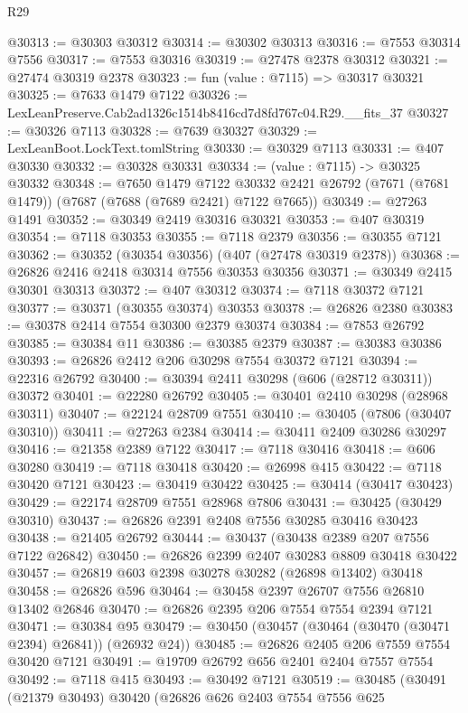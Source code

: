 \begin{lexlean}{R29}
\begin{coremodule}
@30313 := @30303 @30312
@30314 := @30302 @30313
@30316 := @7553 @30314 @7556
@30317 := @7553 @30316
@30319 := @27478 @2378 @30312
@30321 := @27474 @30319 @2378
@30323 := fun (value : @7115) => @30317 @30321
@30325 := @7633 @1479 @7122
@30326 := LexLeanPreserve.Cab2ad1326c1514b8416cd7d8fd767c04.R29.__fits_37
@30327 := @30326 @7113
@30328 := @7639 @30327
@30329 := LexLeanBoot.LockText.tomlString
@30330 := @30329 @7113
@30331 := @407 @30330
@30332 := @30328 @30331
@30334 := (value : @7115) -> @30325 @30332
@30348 := @7650
    @1479
    @7122
    @30332
    @2421
    @26792
    (@7671 (@7681 @1479))
    (@7687 (@7688 (@7689 @2421) @7122 @7665))
@30349 := @27263 @1491
@30352 := @30349 @2419 @30316 @30321
@30353 := @407 @30319
@30354 := @7118 @30353
@30355 := @7118 @2379
@30356 := @30355 @7121
@30362 := @30352 (@30354 @30356) (@407 (@27478 @30319 @2378))
@30368 := @26826 @2416 @2418 @30314 @7556 @30353 @30356
@30371 := @30349 @2415 @30301 @30313
@30372 := @407 @30312
@30374 := @7118 @30372 @7121
@30377 := @30371 (@30355 @30374) @30353
@30378 := @26826 @2380
@30383 := @30378 @2414 @7554 @30300 @2379 @30374
@30384 := @7853 @26792
@30385 := @30384 @11
@30386 := @30385 @2379
@30387 := @30383 @30386
@30393 := @26826 @2412 @206 @30298 @7554 @30372 @7121
@30394 := @22316 @26792
@30400 := @30394 @2411 @30298 (@606 (@28712 @30311)) @30372
@30401 := @22280 @26792
@30405 := @30401 @2410 @30298 (@28968 @30311)
@30407 := @22124 @28709 @7551
@30410 := @30405 (@7806 (@30407 @30310))
@30411 := @27263 @2384
@30414 := @30411 @2409 @30286 @30297
@30416 := @21358 @2389 @7122
@30417 := @7118 @30416
@30418 := @606 @30280
@30419 := @7118 @30418
@30420 := @26998 @415
@30422 := @7118 @30420 @7121
@30423 := @30419 @30422
@30425 := @30414 (@30417 @30423)
@30429 := @22174 @28709 @7551 @28968 @7806
@30431 := @30425 (@30429 @30310)
@30437 := @26826 @2391 @2408 @7556 @30285 @30416 @30423
@30438 := @21405 @26792
@30444 := @30437 (@30438 @2389 @207 @7556 @7122 @26842)
@30450 := @26826 @2399 @2407 @30283 @8809 @30418 @30422
@30457 := @26819 @603 @2398 @30278 @30282 (@26898 @13402) @30418
@30458 := @26826 @596
@30464 := @30458 @2397 @26707 @7556 @26810 @13402 @26846
@30470 := @26826 @2395 @206 @7554 @7554 @2394 @7121
@30471 := @30384 @95
@30479 := @30450 (@30457 (@30464 (@30470 (@30471 @2394) @26841)) (@26932 @24))
@30485 := @26826 @2405 @206 @7559 @7554 @30420 @7121
@30491 := @19709 @26792 @656 @2401 @2404 @7557 @7554
@30492 := @7118 @415
@30493 := @30492 @7121
@30519 := @30485
    (@30491
      (@21379 @30493)
      @30420
      (@26826
        @626
        @2403
        @7554
        @7556
        @625

\end{coremodule}
\end{lexlean}
